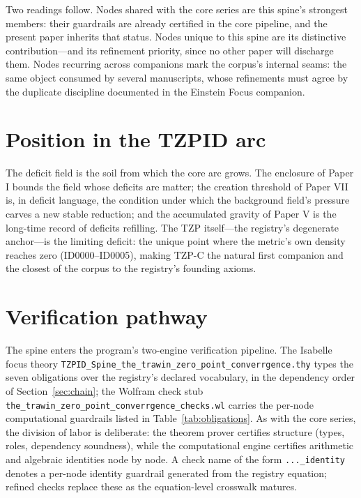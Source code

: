 \documentclass[11pt]{article}
\theoremstyle{remark}
\begin{document}
Two readings follow. Nodes shared with the core series are this spine's strongest members: their guardrails are already certified in the core pipeline, and the present paper inherits that status. Nodes unique to this spine are its distinctive contribution---and its refinement priority, since no other paper will discharge them. Nodes recurring across companions mark the corpus's internal seams: the same object consumed by several manuscripts, whose refinements must agree by the duplicate discipline documented in the Einstein Focus companion.

\section{Position in the TZPID arc}
\label{sec:arc}

The deficit field is the soil from which the core arc grows. The enclosure of Paper I bounds the field whose deficits are matter; the creation threshold of Paper VII is, in deficit language, the condition under which the background field's pressure carves a new stable reduction; and the accumulated gravity of Paper V is the long-time record of deficits refilling. The TZP itself---the registry's degenerate anchor---is the limiting deficit: the unique point where the metric's own density reaches zero (ID0000--ID0005), making TZP-C the natural first companion and the closest of the corpus to the registry's founding axioms.

\section{Verification pathway}
\label{sec:verify}

The spine enters the program's two-engine verification pipeline. The Isabelle focus theory \texttt{TZPID\_Spine\_the\_trawin\_zero\_point\_converrgence.thy} types the seven obligations over the registry's declared vocabulary, in the dependency order of Section~\ref{sec:chain}; the Wolfram check stub \texttt{the\_trawin\_zero\_point\_converrgence\_checks.wl} carries the per-node computational guardrails listed in Table~\ref{tab:obligations}. As with the core series, the division of labor is deliberate: the theorem prover certifies structure (types, roles, dependency soundness), while the computational engine certifies arithmetic and algebraic identities node by node. A check name of the form \texttt{...\_identity} denotes a per-node identity guardrail generated from the registry equation; refined checks replace these as the equation-level crosswalk matures.
\end{document}
